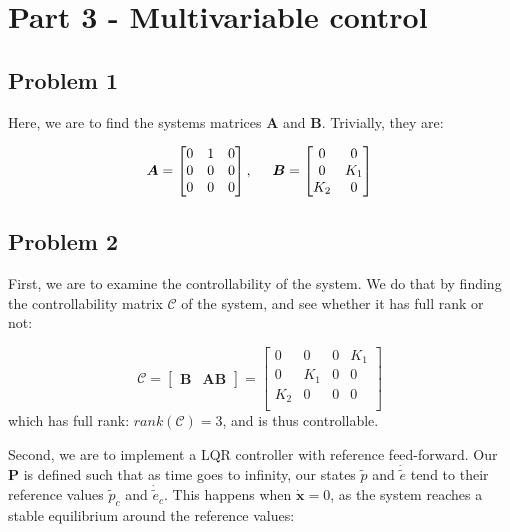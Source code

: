 \section{Part 3 - Multivariable control}
\subsection{Problem 1}
Here, we are to find the systems matrices $\boldsymbol{A}$ and
$\boldsymbol{B}$. Trivially, they are:

\begin{equation}
  \boldsymbol{A} = \begin{bmatrix}
    0 & 1 & 0 \\
    0 & 0 & 0 \\
    0 & 0 & 0 \\
  \end{bmatrix}, \hspace{0.5cm}
  \boldsymbol{B} = \begin{bmatrix}
    0 & 0 \\
    0 & K_1 \\
    K_2 & 0 \\
  \end{bmatrix}
\end{equation}

\subsection{Problem 2}
First, we are to examine the controllability of the system. We do that
by finding the controllability matrix $\boldsymbol{\mathcal{C}}$ of
the system, and see whether it has full rank or not:

\begin{equation}
  \boldsymbol{\mathcal{C}} = \begin{bmatrix}
    \boldsymbol{B} & \boldsymbol{AB}
  \end{bmatrix}
  =
  \begin{bmatrix}
    0 & 0 & 0 & K_1 \\
    0 & K_1 & 0 & 0 \\
    K_2 & 0 & 0 & 0 \\
  \end{bmatrix}
\end{equation}
which has full rank: $rank(\boldsymbol{\mathcal{C}}) = 3$, and is thus
controllable.

Second, we are to implement a LQR controller with reference feed-forward. Our $\boldsymbol{P}$ is defined such that as time goes to infinity, our states $\tilde{p}$ and $\dot{\tilde{e}}$ tend to their reference values $\tilde{p}_c$ and $\dot{\tilde{e}}_c$. This happens when
$\dot{\boldsymbol{x}} = 0$, as the system reaches a stable equilibrium
around the reference values:

